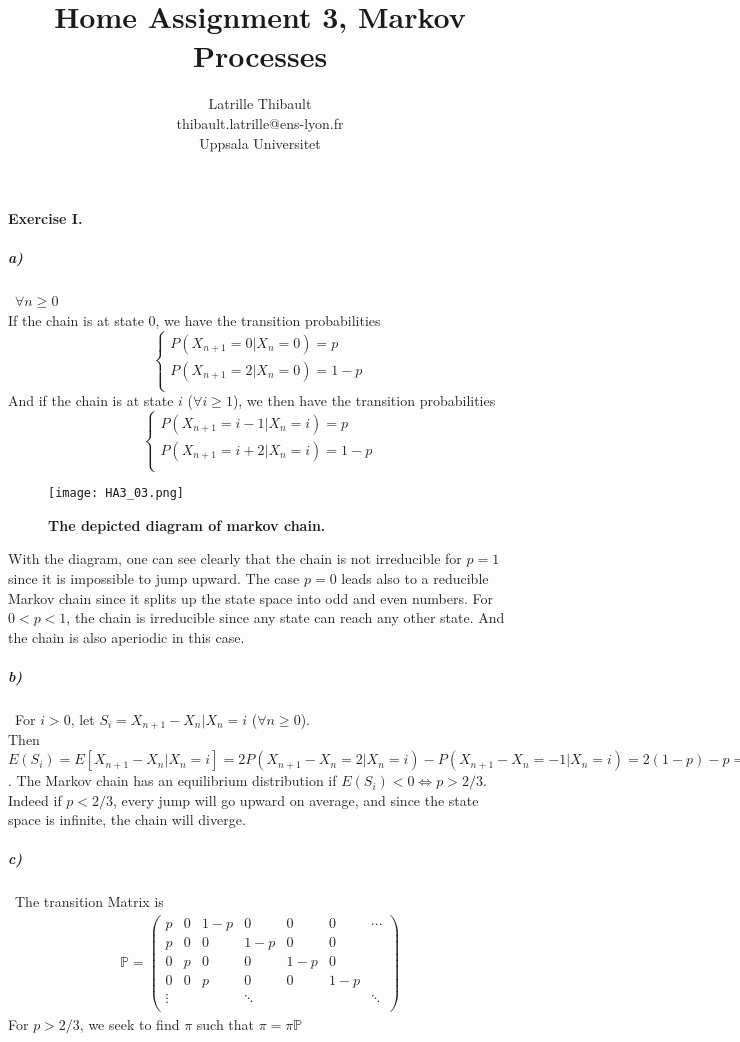 \documentclass{article}
\author{Latrille Thibault\\
\small thibault.latrille@ens-lyon.fr\\[-0.8ex]
\small Uppsala Universitet\\}
\title{Home Assignment 3, Markov Processes}
\begin{document}
\maketitle
\paragraph{Exercise I.\\}
\subparagraph{a)}\
$\forall n \geq 0$\\
If the chain is at state $0$, we have the transition probabilities 
$$
\displaystyle \left \{
    \begin{array}{l}
        P(X_{n+1}=0|X_{n}=0)=p \\
		P(X_{n+1}=2|X_{n}=0)=1-p \\
    \end{array}
\right.
$$
And if the chain is at state $i$ ($\forall i \geq 1$), we then have the transition probabilities 
$$
\displaystyle \left \{
    \begin{array}{l}
        P(X_{n+1}=i-1|X_{n}=i)=p \\
		P(X_{n+1}=i+2|X_{n}=i)=1-p \\
    \end{array}
\right.
$$

\begin{figure}[H]
	  \centering
  	\texttt{[image: HA3\_03.png]}
  	  	\caption{\textbf{The depicted diagram of markov chain.}}
	\end{figure}
With the diagram, one can see clearly that the chain is not irreducible for $p=1$ since it is impossible to jump upward. The case $p=0$ leads also to a reducible Markov chain since it splits up the state space into odd and even numbers. For $0<p<1$, the chain is irreducible since any state can reach any other state. And the chain is also aperiodic in this case.
\subparagraph{b)}
\
For $i>0$, let $S_i=X_{n+1}-X_{n}|X_n=i$ ($\forall n\geq 0$).\\
Then 
$E(S_i)=E[X_{n+1}-X_{n}|X_n=i]=2P(X_{n+1}-X_n=2|X_n=i)-P(X_{n+1}-X_n=-1|X_n=i)=2(1-p)-p=2-3p$. The Markov chain has an equilibrium distribution if $E(S_i)<0\iff p>2/3$. Indeed if $p<2/3$, every jump will go upward on average, and since the state space is infinite, the chain will diverge. 
\subparagraph{c)}
\
The transition Matrix is 
\begin{align*}
\mathbb{P}=
\begin{pmatrix}
p & 0 & 1-p & 0 & 0 & 0 &\cdots  \\
p & 0 & 0 & 1-p & 0 & 0 & \\
0 & p & 0 & 0 & 1-p & 0 & \\
0 & 0 & p & 0 & 0 & 1-p &  \\
\vdots &  &  & \ddots & &  & \ddots  \\
\end{pmatrix}
\end{align*}
For $p>2/3$, we seek to find $\pi$ such that $\pi=\pi\mathbb{P}$
\end{document}
